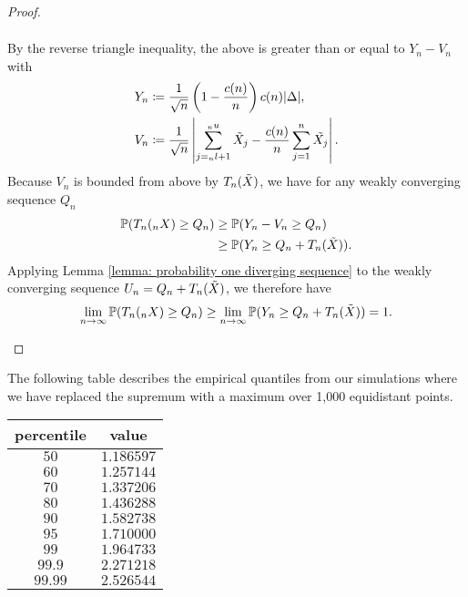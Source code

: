\begin{proof}
\begin{aufzi}
\begin{align*}
        \end{align*}
        By the reverse triangle inequality, the above is greater than or equal to $Y_n - V_n$ with
        \begin{align*}
            Y_n & \coloneqq  \frac{1}{\sqrt{n}} \left( 1 - \frac{c(n)}{n} \right)c(n) |\Delta|, \\
            V_n & \coloneqq \frac{1}{\sqrt{n}} \left| \sum\limits_{j = {}_{n}l +1}^{{}_{n}u} \Tilde{X}_j - \frac{c(n)}{n} \sum\limits_{j=1}^{n} \Tilde{X_j} \right|.
        \end{align*}
        Because $V_n$ is bounded from above by $T_n(\Tilde{X})$, we have for any weakly converging sequence $Q_n$
        \begin{align*} \label{eindim Tn Yn Un}
            \mathbb{P}(T_n({}_{n}X) \geq Q_n) 
            & \geq \mathbb{P}(Y_n - V_n \geq Q_n) \\
            & \geq \mathbb{P}(Y_n \geq Q_n + T_n(\Tilde{X})).
        \end{align*}
        Applying Lemma \ref{lemma: probability one diverging sequence} to the weakly converging sequence $U_n = Q_n + T_n(\Tilde{X})$, we therefore have
        \[ \lim\limits_{n \to \infty} \mathbb{P}(T_n({}_{n}X) \geq Q_n) \geq \lim\limits_{n \to \infty} \mathbb{P}(Y_n \geq Q_n + T_n(\Tilde{X})) = 1. \]
    \end{aufzi}
\end{proof}

The following table describes the empirical quantiles from our simulations where we have replaced the supremum with a maximum over 1,000 equidistant points.
\begin{center}
    \begin{tabular}{|c | c|} 
     \hline
     percentile & value \\ [0.5ex] 
     \hline\hline
     $50$ & $1.186597$ \\ 
     \hline
     $60$ & $1.257144$ \\
     \hline
     $70$ & $1.337206$ \\
     \hline
     $80$ & $1.436288$ \\ 
     \hline
     $90$ & $1.582738$ \\ 
     \hline
     $95$ & $1.710000$ \\
     \hline
     $99$ & $1.964733$ \\ 
     \hline
     $99.9$ & $2.271218$ \\
     \hline
     $99.99$ & $2.526544$ \\  %
     \hline
    \end{tabular}
\end{center}

